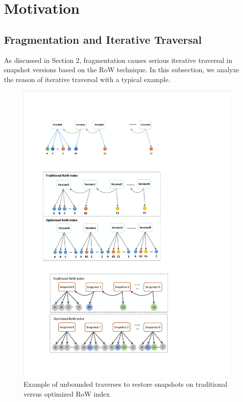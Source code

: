 \documentclass[sigconf, nonacm]{acmart}
\begin{document}
\section{Motivation}
\label{Motivation}

\subsection{Fragmentation and Iterative Traversal}
As discussed in Section 2, fragmentation causes serious iterative
traversal in snapshot versions based on the RoW technique. In this
subsection, we analyze the reason of iterative traversal with a typical
example.

\begin{figure}[htp]
	\centering
	\includegraphics[width=\columnwidth]{figures/ceph_pic/orig_RoW_and_OpRoW.pdf}
	\caption{Example of unbounded traverses to restore snapshots on traditional versus optimized RoW index}
	\label{fig:row-index-vs}
\end{figure}
\end{document}
